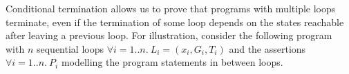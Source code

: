 \documentclass[preprint]{sigplanconf}
\theoremstyle{definition}
\begin{document}

%
% 


\iffalse

Conditional termination allows us to
prove that programs with multiple loops terminate, even if the termination of some loop depends on the states
reachable after leaving a previous loop.
For illustration, consider the following program with $n$ sequential loops $\forall i=1..n. ~L_i=(x_i,G_i,T_i)$ and
the assertions $\forall i=1..n. ~P_i$ modelling the program statements in between loops. 
\end{document}
